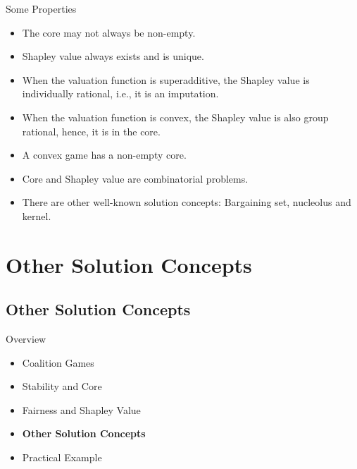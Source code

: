 \documentclass{beamer}
\begin{document}
\begin{frame}{Some Properties}
    \begin{itemize}
        \item The core may not always be non-empty.
        \item Shapley value always exists and is unique.
        \item When the valuation function is {\color{blue}superadditive}, the Shapley value is {\color{blue}individually rational}, i.e., it is an imputation.
        \item When the valuation function is {\color{blue}convex}, the Shapley value is also group rational, hence, it is in the {\color{blue}core}.
        \item A convex game has a non-empty core.
        \item Core and Shapley value are combinatorial problems.
        \item There are other well-known solution concepts: Bargaining set, nucleolus and kernel.
    \end{itemize}
\end{frame}

\section{Other Solution Concepts}
\subsection{Other Solution Concepts}

\begin{frame}{Overview}
    \begin{itemize}
     	\itemsep=.5cm
    	\item Coalition Games
    	\item Stability and Core
    	\item Fairness and Shapley Value
    	\item {\bf Other Solution Concepts}
        \item Practical Example
    \end{itemize}
\end{frame}
\end{document}
